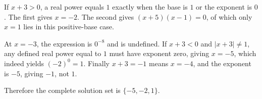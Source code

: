 If $x+3>0$, a real power equals $1$ exactly when the base is $1$ or the exponent is $0$. The first gives $x=-2$. The second gives $(x+5)(x-1)=0$, of which only $x=1$ lies in this positive-base case.

At $x=-3$, the expression is $0^{-8}$ and is undefined. If $x+3<0$ and $|x+3|\ne1$, any defined real power equal to $1$ must have exponent zero, giving $x=-5$, which indeed yields $(-2)^0=1$. Finally $x+3=-1$ means $x=-4$, and the exponent is $-5$, giving $-1$, not $1$.

Therefore the complete solution set is $\boxed{\{-5,-2,1\}}$.
